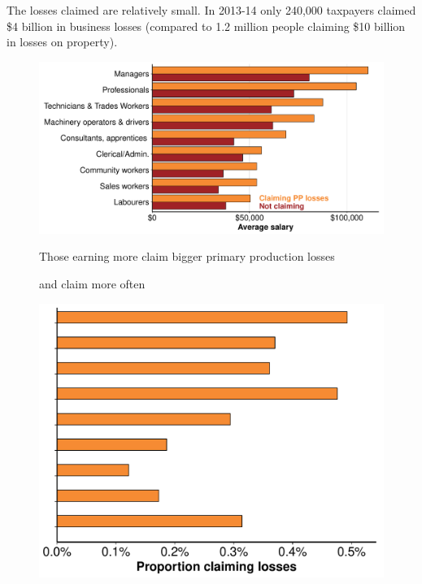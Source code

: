 The losses claimed are relatively small. In 2013-14 only 240,000 taxpayers claimed \$4 billion in business losses (compared to 1.2 million people claiming \$10 billion in losses on property).\label{insec:number-taxpayers-claiming-business-losses}

\newlength{\specialfigurewidth}
\setlength{\specialfigurewidth}{0.875\columnwidth}

\begin{figure}[t]
\caption{Those earning more claim bigger primary production losses\label{fig:PP-losses-by-salary}}
{\includegraphics[width=1.27273\specialfigurewidth, right]{CGT-NG-atlas/PP-losers-salary-comparison-horiz-bar-1.pdf}}
\end{figure}

\begin{figure}[t]
\caption*{and claim more often}
\includegraphics[width=0.8\specialfigurewidth]{CGT-NG-atlas/Proportions-PP-losses-1.pdf}
\caption*{\phantom{.}}
\end{figure}

